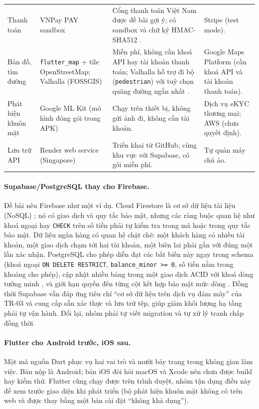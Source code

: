 {\begin{longtable}{>{\raggedright\arraybackslash}p{}>{\raggedright\arraybackslash}p{}>{\raggedright\arraybackslash}p{}>{\raggedright\arraybackslash}p{}}
Thanh toán & VNPay PAY sandbox & Cổng thanh toán Việt Nam được đề bài gợi ý; có sandbox và chữ ký HMAC-SHA512 \parencite{ch2-vnpay-pay}. & Stripe (test mode). \\
Bản đồ, tìm đường & \texttt{flutter\_\allowbreak{}map} + tile OpenStreetMap; Valhalla (FOSSGIS) & Miễn phí, không cần khoá API hay tài khoản thanh toán; Valhalla hỗ trợ đi bộ (\texttt{pedestrian}) với tuỳ chọn quãng đường ngắn nhất \parencite{ch2-valhalla}. & Google Maps Platform (cần khoá API và tài khoản thanh toán). \\
Phát hiện khuôn mặt & Google ML Kit (mô hình đóng gói trong APK) & Chạy trên thiết bị, không gửi ảnh đi, không cần tài khoản. & Dịch vụ eKYC thương mại; AWS (chưa quyết định). \\
Lưu trữ API & Render web service (Singapore) & Triển khai từ GitHub, cùng khu vực với Supabase, có gói miễn phí. & Tự quản máy chủ ảo. \\
\end{longtable}
}

\paragraph{Supabase/PostgreSQL thay cho Firebase.} Đề bài nêu Firebase như một ví dụ. Cloud Firestore là cơ sở dữ liệu tài liệu (NoSQL) \parencite{ch2-firestore}; nó có giao dịch và quy tắc bảo mật, nhưng các ràng buộc quan hệ như khoá ngoại hay \texttt{CHECK} trên số tiền phải tự kiểm tra trong mã hoặc trong quy tắc bảo mật. Dữ liệu ngân hàng có quan hệ chặt chẽ: một khách hàng có nhiều tài khoản, một giao dịch chạm tới hai tài khoản, một biên lai phải gắn với đúng một lần xác nhận. PostgreSQL cho phép diễn đạt các bất biến này ngay trong schema (khoá ngoại \texttt{ON DELETE RESTRICT}, \texttt{balance\_\allowbreak{}minor >= 0}, số tiền nằm trong khoảng cho phép), cập nhật nhiều bảng trong một giao dịch ACID với khoá dòng tường minh \parencite{ch2-pg-transactions,ch2-pg-locking}, và giới hạn quyền đến từng cột kết hợp bảo mật mức dòng \parencite{ch2-pg-rls}. Đồng thời Supabase vẫn đáp ứng tiêu chí ``cơ sở dữ liệu trên dịch vụ đám mây'' của TR-03 và cung cấp sẵn xác thực và lưu trữ tệp, giúp giảm khối lượng hạ tầng phải tự vận hành. Đổi lại, nhóm phải tự viết migration và tự xử lý tranh chấp đồng thời.

\paragraph{Flutter cho Android trước, iOS sau.} Một mã nguồn Dart phục vụ hai vai trò và mười bảy trang trong không gian làm việc. Bản nộp là Android; bản iOS đòi hỏi macOS và Xcode nên chưa được build hay kiểm thử. Flutter cũng chạy được trên trình duyệt, nhóm tận dụng điều này để xem trước giao diện khi phát triển (bộ phát hiện khuôn mặt không có trên web và được thay bằng một bản cài đặt ``không khả dụng'').

